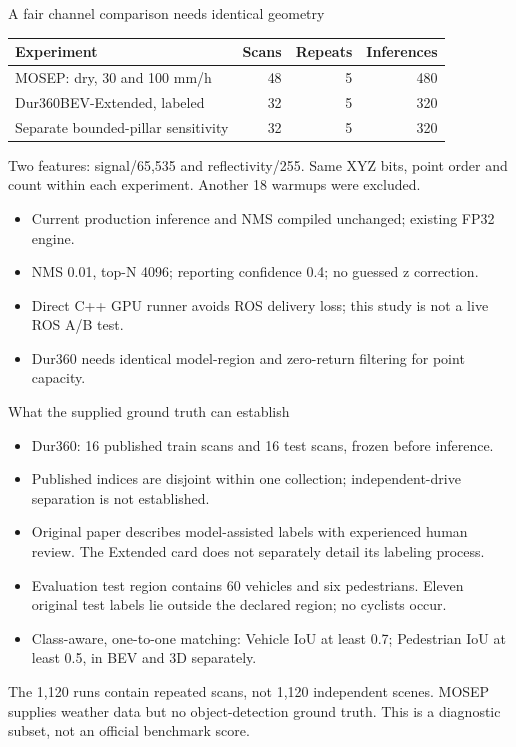 \documentclass[aspectratio=169,11pt]{beamer}
\begin{document}
\begin{frame}[t]{A fair channel comparison needs identical geometry}
\small
\begin{tabularx}{\linewidth}{@{}Yrrr@{}}
\toprule Experiment & Scans & Repeats & Inferences \\ \midrule
MOSEP: dry, 30 and 100 mm/h & 48 & 5 & 480 \\
Dur360BEV-Extended, labeled & 32 & 5 & 320 \\
Separate bounded-pillar sensitivity & 32 & 5 & 320 \\
\bottomrule
\end{tabularx}
\medskip
Two features: signal/65,535 and reflectivity/255. Same XYZ bits, point order
and count within each experiment. Another 18 warmups were excluded.
\begin{itemize}
\item Current production inference and NMS compiled unchanged; existing FP32 engine.
\item NMS 0.01, top-N 4096; reporting confidence 0.4; no guessed z correction.
\item Direct C++ GPU runner avoids ROS delivery loss; this study is not a live ROS A/B test.
\item Dur360 needs identical model-region and zero-return filtering for point capacity.
\end{itemize}
\end{frame}

\begin{frame}[t]{What the supplied ground truth can establish}
\begin{itemize}
\item Dur360: 16 published train scans and 16 test scans, frozen before inference.
\item Published indices are disjoint within one collection; independent-drive
separation is not established.
\item Original paper describes model-assisted labels with experienced human review.
The Extended card does not separately detail its labeling process.
\item Evaluation test region contains 60 vehicles and six pedestrians. Eleven
original test labels lie outside the declared region; no cyclists occur.
\item Class-aware, one-to-one matching: Vehicle IoU at least 0.7;
Pedestrian IoU at least 0.5, in BEV and 3D separately.
\end{itemize}
\small
The 1,120 runs contain repeated scans, not 1,120 independent scenes.
MOSEP supplies weather data but no object-detection ground truth.
This is a diagnostic subset, not an official benchmark score.
\end{frame}
\end{document}
